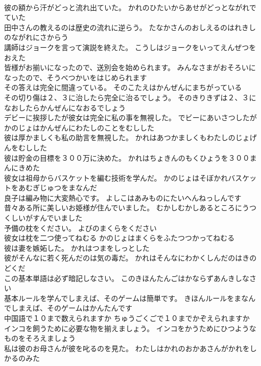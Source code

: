 \documentclass[8pt]{extreport}
\begin{document}
\begin{CJK}{UTF8}{min}
\\	彼の額から汗がどっと流れ出ていた。	かれのひたいからあせがどっとながれでていた 
\\	田中さんの教えるのは歴史の流れに逆らう。	たなかさんのおしえるのはれきしのながれにさからう 
\\	講師はジョークを言って演説を終えた。	こうしはジョークをいってえんぜつをおえた 
\\	皆様がお揃いになったので、送別会を始められます。	みんなさまがおそろいになったので、そうべつかいをはじめられます 
\\	その答えは完全に間違っている。	そのこたえはかんぜんにまちがっている 
\\	その切り傷は２、３に治したら完全に治るでしょう。	そのきりきずは２、３になおしたらかんぜんになおるでしょう 
\\	デビーに挨拶したが彼女は完全に私の事を無視した。	でビーにあいさつしたがかのじょはかんぜんにわたしのことをむしした 
\\	彼は厚かましくも私の助言を無視した。	かれはあつかましくもわたしのじょげんをむしした 
\\	彼は貯金の目標を３００万に決めた。	かれはちょきんのもくひょうを３００まんにきめた 
\\	彼女は祖母からバスケットを編む技術を学んだ。	かのじょはそぼかれバスケットをあむぎじゅつをまなんだ 
\\	良子は編み物に大変熱心です。	よしこはあみものにたいへんねっしんです 
\\	昔々ある所に美しいお姫様が住んでいました。	むかしむかしあるところにうつくしいがすんでいました 
\\	予備の枕をください。	よびのまくらをください 
\\	彼女は枕を二つ使ってねむる	かのじょはまくらをふたつつかってねむる 
\\	彼は妻を嫉妬した。	かれはつまをしっとした 
\\	彼がそんなに若く死んだのは気の毒だ。	かれはそんなにわかくしんだのはきのどくだ 
\\	この基本単語は必ず暗記しなさい。	このきほんたんごはかならずあんきしなさい 
\\	基本ルールを学んでしまえば、そのゲームは簡単です。	きほんルールをまなんでしまえば、そのゲームはかんたんです 
\\	中国語で１０まで数えられますか	ちゅうごくごで１０までかぞえられますか 
\\	インコを飼うために必要な物を揃えましょう。	インコをかうためにひつようなものをそろえましょう 
\\	私は彼のお母さんが彼を叱るのを見た。	わたしはかれのおかあさんがかれをしかるのみた 

\end{CJK}
\end{document}

